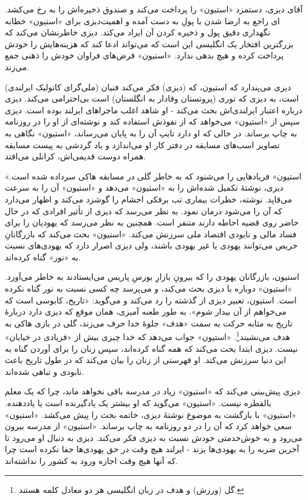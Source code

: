 \documentclass[12pt]{book}
\newcommand{\noun}[1]{«{#1}»}
\begin{document}
    آقای دیزی، دستمزد \noun{استیون} را پرداخت می‌کند و صندوق ذخیره‌اش را به رخ می‌کشد. دیزی برای \noun{استیون} خطابه‎‌ای راجع به ارضا شدن با پولِ به دست آمده و اهمیت نگهداری دقیق پول و ذخیره کردن آن ایراد می‌کند. دیزی خاطرنشان می‌کند که بزرگترین افتخار یک انگلیسی این است که می‌تواند ادعا کند که هزینه‌هایش را خودش پرداخت کرده و هیچ بدهی ندارد. \noun{استیون} قرض‌های فراوان خودش را ذهنی جمع می‌زند.

    دیزی می‌پندارد که استیون، که (دیزی) فکر می‌کند فنیان (ملی‌گرای کاتولیک ایرلندی) است، به دیزی که توری (پروتستان وفادار به انگلستان) است بی‌احترامی می‌کند. دیزی درباره اعتبار ایرلندی‌اش بحث می‌کند - او شاهد اغلب ماجراهای ایرلند بوده است. دیزی سپس از \noun{استیون} می‌خواهد که از نفوذش استفاده کند و نوشته‌ای از او را در روزنامه به چاپ برساند. در حالی که او دارد تایپ آن را به پایان می‌رساند، \noun{استیون} نگاهی به تصاویر اسب‌های مسابقه در دفتر کار او می‌اندازد و یاد گردشی به پیست مسابقه همراه دوست قدیمی‌اش، کرانلی می‌افتد.

    \noun{استیون} فریادهایی را می‌شنود که به خاطر گلی در مسابقه هاکی سرداده شده است. دیزی، نوشتۀ تکمیل شده‌اش را به \noun{استیون} می‌دهد و \noun{استیون} آن را به سرعت می‌قاپد. نوشته، خطرات بیماری تب برفکی احشام را گوشزد می‌کند و اظهار می‌دارد که آن را می‌شود درمان نمود. به نظر می‌رسد که دیزی از تأثیر افرادی که در حال حاضر روی قضیه احاطه دارند متنفر است. همچنین به نظر می‌رسد که یهودیان را برای فساد مالی و نابودی اقتصاد ملی سرزنش می‌کند. \noun{استیون} بحث می‌کند که بازرگانانِ حریص می‌توانند یهودی یا غیر یهودی باشند، ولی دیزی اصرار دارد که یهودی‌های نسبت به «نور» گناه کرده‌اند.

    استیون، بازرگانان یهودی را که بیرونِ بازارِ بورسِ پاریس می‌ایستادند به خاطر می‌آورد. \noun{استیون} دوباره با دیزی بحث می‌کند، و می‌پرسد چه کسی نسبت به نور گناه نکرده است. استیون، تعبیر دیزی از گذشته را رد می‌کند و می‌گوید: «تاریخ، کابوسی است که می‌خواهم از آن بیدار شوم». به طور طعنه آمیزی، همان موقع که دیزی دارد دربارۀ تاریخ به مثابه حرکت به سمت «هدف» جلوۀ خدا حرف می‌زند، گلی در بازی هاکی به هدف می‌نشیند\footnote{ گل (ورزش) و هدف در زبان انگلیسی هر دو معادل کلمه  هستند.}. \noun{استیون} جواب می‌دهد که خدا چیزی بیش از «فریادی در خیابان» نیست. دیزی ابتدا بحث می‌کند که همه گناه کرده‌اند، سپس زنان را برای آوردن گناه به این دنیا سرزنش می‌کند. او فهرستی از زنان را بیان می‌کند که در طول تاریخ باعث نابودی و تباهی شده‌اند.

    دیزی پیش‌بینی می‌کند که \noun{استیون} زیاد در مدرسه باقی نخواهد ماند، چرا که یک معلم بالفطره نیست. \noun{استیون} می‌گوید که او بیشتر یک یادگیرنده است یا یاددهنده. \noun{استیون} با بازگشت به موضوع نوشتۀ دیزی، خاتمه بحث را پیش می‌کشد. \noun{استیون} سعی خواهد کرد که آن را در دو روزنامه به چاپ برساند. \noun{استیون} از مدرسه بیرون می‌رود و به خوش‌خدمتی خودش نسبت به دیزی فکر می‌کند. دیزی به دنبال او می‌رود تا آخرین ضربه را به یهودی‌ها بزند - ایرلند هیچ وقت در حق یهودی‌ها جفا نکرده است چرا که آنها هیچ وقت اجازه ورود به کشور را نداشته‌اند.
\end{document}
